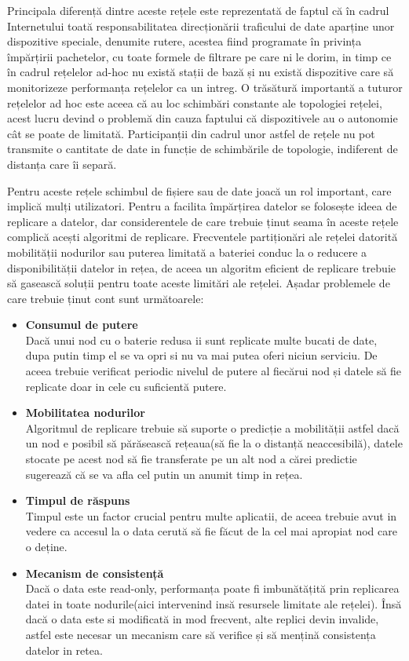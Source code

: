 \documentclass[12pt,a4paper]{report}
\begin{document}
Principala diferență dintre aceste rețele este reprezentată de faptul că în cadrul Internetului toată responsabilitatea direcționării traficului de date aparține unor dispozitive speciale, denumite rutere, acestea fiind programate în privința împărțirii pachetelor, cu toate formele de filtrare pe care ni le dorim, in timp ce în cadrul rețelelor ad-hoc nu există stații de bază și nu există dispozitive care să monitorizeze performanța rețelelor ca un intreg. O trăsătură importantă a tuturor rețelelor ad hoc este aceea că au loc schimbări constante ale topologiei rețelei, acest lucru devind o problemă din cauza faptului că dispozitivele au o autonomie cât se poate de limitată. Participanții din cadrul unor astfel de rețele nu pot transmite o cantitate de date in funcție de schimbările de topologie, indiferent de distanța care îi separă.

Pentru aceste rețele schimbul de fișiere sau de date joacă un rol important, care implică mulți utilizatori. Pentru a facilita împărțirea datelor se folosește ideea de replicare a datelor\cite{CDRA}, dar considerentele de care trebuie ținut seama în aceste rețele complică acești algoritmi de replicare. Frecventele partiționări ale rețelei datorită mobilității nodurilor sau puterea limitată a bateriei conduc la o reducere a disponibilității datelor in rețea, de aceea un algoritm eficient de replicare trebuie să gasească soluții pentru toate aceste limitări ale rețelei. Așadar problemele de care trebuie ținut cont sunt următoarele:
\begin{itemize}
	\item\textbf{Consumul de putere} \hfill \\
	Dacă unui nod cu o baterie redusa ii sunt replicate multe bucati de date, dupa putin timp el se va opri si nu va mai putea oferi niciun serviciu. De aceea trebuie verificat periodic nivelul de putere al fiecărui nod și datele să fie replicate doar in cele cu suficientă putere.
	\item\textbf{Mobilitatea nodurilor} \hfill \\
	Algoritmul de replicare trebuie să suporte o predicție a mobilității astfel dacă un nod e posibil să părăsească rețeaua(să fie la o distanță neaccesibilă), datele stocate pe acest nod să fie transferate pe un alt nod a cărei predictie sugerează că se va afla cel putin un anumit timp in rețea.
	\item\textbf{Timpul de răspuns} \hfill \\
	Timpul este un factor crucial pentru multe aplicatii, de aceea trebuie avut in vedere ca accesul la o data cerută să fie făcut de la cel mai apropiat nod care o deține.
	\item\textbf{Mecanism de consistență} \hfill \\
	Dacă o data este read-only, performanța poate fi imbunătățită prin replicarea datei in toate nodurile(aici intervenind insă resursele limitate ale rețelei). Însă dacă o data este si modificată in mod frecvent, alte replici devin invalide, astfel este necesar un mecanism care să verifice și să mențină consistența datelor in retea.
\end{itemize}
\end{document}
